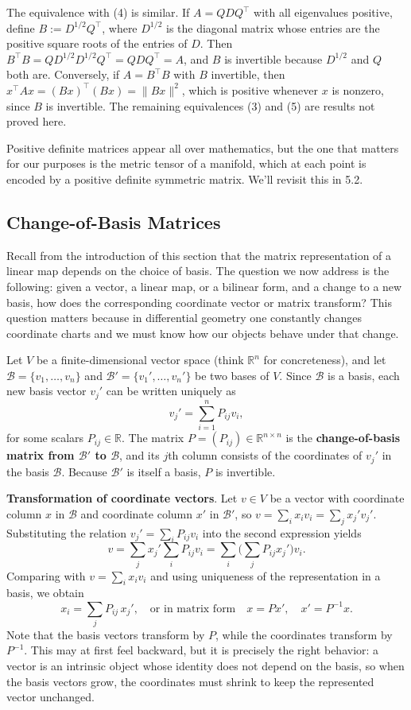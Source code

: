 \documentclass{article}
\begin{document}
The equivalence with (4) is similar. If $A = QDQ^\top$ with all eigenvalues positive, define $B := D^{1/2} Q^\top$, where $D^{1/2}$ is the diagonal matrix whose entries are the positive square roots of the entries of $D$. Then $B^\top B = Q D^{1/2} D^{1/2} Q^\top = QDQ^\top = A$, and $B$ is invertible because $D^{1/2}$ and $Q$ both are. Conversely, if $A = B^\top B$ with $B$ invertible, then $x^\top A x = (Bx)^\top (Bx) = \|Bx\|^2$, which is positive whenever $x$ is nonzero, since $B$ is invertible. The remaining equivalences (3) and (5) are results not proved here.
 
Positive definite matrices appear all over mathematics, but the one that matters for our purposes is the metric tensor of a manifold, which at each point is encoded by a positive definite symmetric matrix. We'll revisit this in 5.2.
 
\subsection{Change-of-Basis Matrices}
 
Recall from the introduction of this section that the matrix representation of a linear map depends on the choice of basis. The question we now address is the following: given a vector, a linear map, or a bilinear form, and a change to a new basis, how does the corresponding coordinate vector or matrix transform? This question matters because in differential geometry one constantly changes coordinate charts and we must know how our objects behave under that change.
 
Let $V$ be a finite-dimensional vector space (think $\mathbb{R}^n$ for concreteness), and let $\mathcal{B} = \{v_1, \dots, v_n\}$ and $\mathcal{B}' = \{v_1', \dots, v_n'\}$ be two bases of $V$. Since $\mathcal{B}$ is a basis, each new basis vector $v_j'$ can be written uniquely as
$$v_j' = \sum_{i=1}^n P_{ij} v_i,$$
for some scalars $P_{ij} \in \mathbb{R}$. The matrix $P = (P_{ij}) \in \mathbb{R}^{n \times n}$ is the \textbf{change-of-basis matrix from $\mathcal{B}'$ to $\mathcal{B}$}, and its $j$th column consists of the coordinates of $v_j'$ in the basis $\mathcal{B}$. Because $\mathcal{B}'$ is itself a basis, $P$ is invertible.
 
\textbf{Transformation of coordinate vectors}. Let $v \in V$ be a vector with coordinate column $x$ in $\mathcal{B}$ and coordinate column $x'$ in $\mathcal{B}'$, so $v = \sum_i x_i v_i = \sum_j x_j' v_j'$. Substituting the relation $v_j' = \sum_i P_{ij} v_i$ into the second expression yields
$$v = \sum_j x_j' \sum_i P_{ij} v_i = \sum_i \Big( \sum_j P_{ij} x_j' \Big) v_i.$$
Comparing with $v = \sum_i x_i v_i$ and using uniqueness of the representation in a basis, we obtain
$$x_i = \sum_j P_{ij}\, x_j', \quad \text{or in matrix form} \quad x = P x', \quad x' = P^{-1} x.$$
Note that the basis vectors transform by $P$, while the coordinates transform by $P^{-1}$. This may at first feel backward, but it is precisely the right behavior: a vector is an intrinsic object whose identity does not depend on the basis, so when the basis vectors grow, the coordinates must shrink to keep the represented vector unchanged.
 
\end{document}
